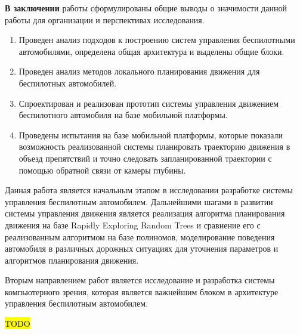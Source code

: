 \textbf{В заключении} работы сформулированы общие выводы о значимости данной работы для
организации и перспективах исследования.

\begin{enumerate}
    \item Проведен анализ подходов к построению систем управления беспилотными 
          автомобилями, определена общая архитектура и выделены общие блоки.
    \item Проведен анализ методов локального планирования движения для беспилотных автомобилей.
    \item Спроектирован и реализован прототип системы управления движением беспилотного 
          автомобиля на базе мобильной платформы.
    \item Проведены испытания на базе мобильной платформы, которые показали возможность
          реализованной системы планировать траекторию движения в объезд препятствий и 
          точно следовать запланированной траектории с помощью обратной связи от камеры глубины.
          
\end{enumerate}

Данная работа является начальным этапом в исследовании разработке системы управления
беспилотным автомобилем. Дальнейшими шагами в развитии системы управления движения является
реализация алгоритма планирования движения на базе Rapidly Exploring Random Trees и сравнение
его с реализованным алгоритмом на базе полиномов, моделирование поведения автомобиля в 
различных дорожных ситуациях для уточнения параметров и алгоритмов планирования движения.

Вторым направлением работ является исследование и разработка системы компьютерного зрения,
которая является важнейшим блоком в архитектуре управления беспилотным автомобилем.

\hl{TODO}

